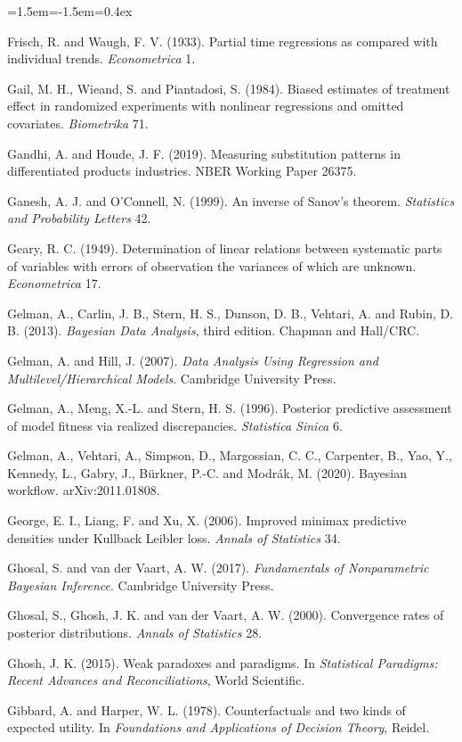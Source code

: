 \begin{list}{}{\leftmargin=1.5em\itemindent=-1.5em\itemsep=0.4ex}
\item Frisch, R. and Waugh, F. V. (1933). Partial time regressions as compared with individual trends. \emph{Econometrica} 1.
\item Gail, M. H., Wieand, S. and Piantadosi, S. (1984). Biased estimates of treatment effect in randomized experiments with nonlinear regressions and omitted covariates. \emph{Biometrika} 71.
\item Gandhi, A. and Houde, J. F. (2019). Measuring substitution patterns in differentiated products industries. NBER Working Paper 26375.
\item Ganesh, A. J. and O'Connell, N. (1999). An inverse of Sanov's theorem. \emph{Statistics and Probability Letters} 42.
\item Geary, R. C. (1949). Determination of linear relations between systematic parts of variables with errors of observation the variances of which are unknown. \emph{Econometrica} 17.
\item Gelman, A., Carlin, J. B., Stern, H. S., Dunson, D. B., Vehtari, A. and Rubin, D. B. (2013). \emph{Bayesian Data Analysis}, third edition. Chapman and Hall/CRC.
\item Gelman, A. and Hill, J. (2007). \emph{Data Analysis Using Regression and Multilevel/Hierarchical Models}. Cambridge University Press.
\item Gelman, A., Meng, X.-L. and Stern, H. S. (1996). Posterior predictive assessment of model fitness via realized discrepancies. \emph{Statistica Sinica} 6.
\item Gelman, A., Vehtari, A., Simpson, D., Margossian, C. C., Carpenter, B., Yao, Y., Kennedy, L., Gabry, J., B\"urkner, P.-C. and Modr\'ak, M. (2020). Bayesian workflow. arXiv:2011.01808.
\item George, E. I., Liang, F. and Xu, X. (2006). Improved minimax predictive densities under Kullback Leibler loss. \emph{Annals of Statistics} 34.
\item Ghosal, S. and van der Vaart, A. W. (2017). \emph{Fundamentals of Nonparametric Bayesian Inference}. Cambridge University Press.
\item Ghosal, S., Ghosh, J. K. and van der Vaart, A. W. (2000). Convergence rates of posterior distributions. \emph{Annals of Statistics} 28.
\item Ghosh, J. K. (2015). Weak paradoxes and paradigms. In \emph{Statistical Paradigms: Recent Advances and Reconciliations}, World Scientific.
\item Gibbard, A. and Harper, W. L. (1978). Counterfactuals and two kinds of expected utility. In \emph{Foundations and Applications of Decision Theory}, Reidel.

\end{list}
